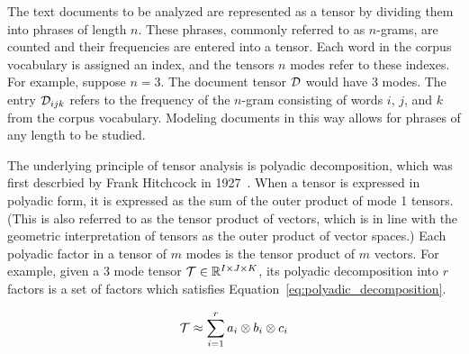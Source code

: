 \documentclass[../dissertation.tex]{subfiles}
\begin{document}
The text documents to be analyzed are represented as a tensor by
dividing them into phrases of length $n$.  These phrases, commonly
referred to as $n$-grams, are counted and their frequencies are
entered into a tensor.  Each word in the corpus vocabulary is assigned
an index, and the tensors $n$ modes refer to these indexes.  For
example, suppose $n=3$.  The document tensor $\mathcal{D}$ would have
3 modes.  The entry $\mathcal{D}_{ijk}$ refers to the frequency of the
$n$-gram consisting of words $i$, $j$, and $k$ from the corpus
vocabulary.  Modeling documents in this way allows for phrases of any
length to be studied.

The underlying principle of tensor analysis is polyadic decomposition,
which was first descrbied by Frank Hitchcock in
1927~\cite{hitchcock1927}.  When a tensor is expressed in polyadic
form, it is expressed as the sum of the outer product of mode 1
tensors.  (This is also referred to as the tensor product of vectors,
which is in line with the geometric interpretation of tensors as the
outer product of vector spaces.)  Each polyadic factor in a tensor of
$m$ modes is the tensor product of $m$ vectors.  For example, given a
3 mode tensor $\mathcal{T} \in \mathbb{R}^{I\times J \times K}$, its
polyadic decomposition into $r$ factors is a set of factors which
satisfies Equation~\ref{eq:polyadic_decomposition}.

\begin{equation} \label{eq:polyadic_decompositon}
  \mathcal{T} \approx \displaystyle\sum_{i=1}^{r} a_i \otimes b_i
  \otimes c_i
\end{equation}
\end{document}
